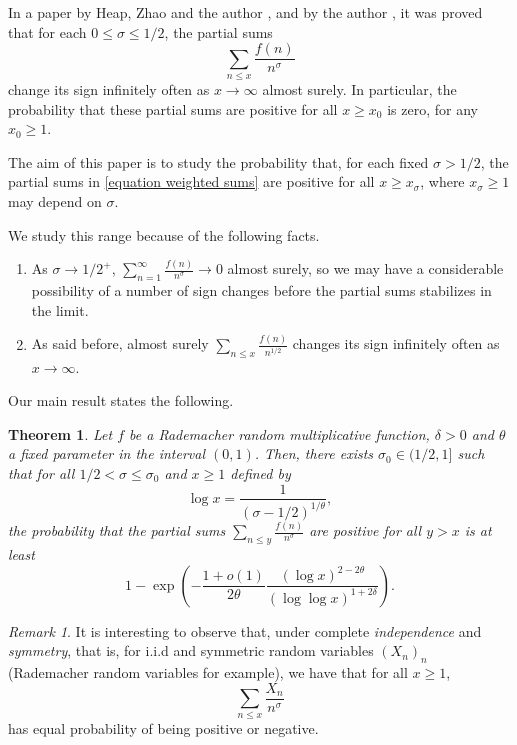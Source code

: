 \documentclass[reqno0,12pt]{amsart}
\newtheorem{theorem}{Theorem}[section]
\theoremstyle{remark}
\newtheorem{remark}{Remark}[section]
\begin{document}
In a paper by Heap, Zhao and the author \cite{aymone_sign_changes}, and by the author \cite{aymone_sign_changes_II}, it was proved that for each $0\leq \sigma\leq 1/2$, the partial sums
\begin{equation}\label{equation weighted sums}
\sum_{n\leq x}\frac{f(n)}{n^\sigma}
\end{equation}
change its sign infinitely often as $x\to\infty$ almost surely. In particular, the probability that these partial sums are positive for all $x\geq x_0$ is zero, for any $x_0\geq 1$.

The aim of this paper is to study the probability that, for each fixed $\sigma>1/2$, the partial sums in \eqref{equation weighted sums} are positive for all $x\geq x_\sigma$, where $x_{\sigma}\geq 1$ may depend on $\sigma$. 

We study this range because of the following facts.

\begin{enumerate}
\item As $\sigma\to1/2^{+}$, $\sum_{n=1}^\infty\frac{f(n)}{n^\sigma}\to 0$ almost surely, so we may have a considerable possibility of a number of sign changes before the partial sums stabilizes in the limit.
\item As said before, almost surely $\sum_{n\leq x}\frac{f(n)}{n^{1/2}}$ changes its sign infinitely often as $x\to\infty$.
\end{enumerate}

Our main result states the following.
\begin{theorem}\label{theorem principal} Let $f$ be a Rademacher random multiplicative function, $\delta>0$ and $\theta$ a fixed parameter in the interval $(0,1)$. Then, there exists $\sigma_0\in(1/2,1]$ such that for all $1/2<\sigma\leq \sigma_0$ and
$x\geq 1$ defined by 
$$\log x =\frac{1}{(\sigma-1/2)^{1/\theta}},$$
the probability that the partial sums $\sum_{n\leq y}\frac{f(n)}{n^\sigma}$ are positive for all $y>x$
is at least
$$1-\exp\left(-\frac{1+o(1)}{2\theta}\frac{(\log x)^{2-2\theta}}{(\log\log x)^{1+2\delta}}\right).$$
\end{theorem}

\begin{remark}
It is interesting to observe that, under complete \textit{independence} and \textit{symmetry}, that is, for i.i.d and symmetric random variables $(X_n)_n$ (Rademacher random variables for example), we have that for all $x\geq 1$, 
$$\sum_{n\leq x}\frac{X_n}{n^\sigma}$$
has equal probability of being positive or negative.
\end{remark}
\end{document}
